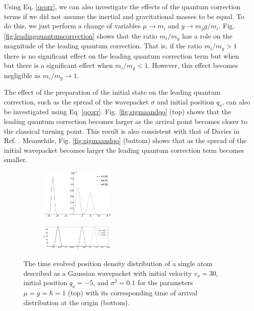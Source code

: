 \documentclass[%
 reprint,
 amsmath,amssymb,
 aps,
]{revtex4-1}
\begin{document}
Using Eq. \eqref{qcorr}, we can also investigate the effects of the quantum correction terms if we did not assume the inertial and gravitational masses to be equal. To do this, we just perform a change of variables $\mu\rightarrow m_i$ and $g\rightarrow m_g g / m_i$. Fig. \ref{fig:leadingquantumcorrection} shows that the ratio $m_i/m_g$ has a role on the magnitude of the leading quantum correction. That is, if the ratio $m_i/m_g>1$ there is no significant effect on the leading quantum correction term but when but there is a significant effect when $m_i/m_g<1$. However, this effect becomes negligible as $m_i/m_g \rightarrow 1$. 

The effect of the preparation of the initial state on the leading quantum correction, such as the spread of the wavepacket $\sigma$ and initial position $q_o$, can also be investigated using Eq. \eqref{qcorr}. Fig. \ref{fig:sigmaandqo} (top) shows that the leading quantum correction becomes larger as the arrival point becomes closer to the classical turning point. This result is also consistent with that of Davies in Ref. \cite{davies2004a}. Meanwhile, Fig. \ref{fig:sigmaandqo} (bottom) shows that as the spread of the initial wavepacket becomes larger the leading quantum correction term becomes smaller.

\begin{figure}[t!]
\begin{subfigure}
\centering
\includegraphics[width=0.4\textwidth]{toadist_wavefunction_evo}
\label{fig:pos_prob}
\end{subfigure}
\begin{subfigure}
\centering
\includegraphics[width=0.4\textwidth]{toadist_covariance_overlay}
\label{fig:toa_dist}
\end{subfigure}
\caption{The time evolved position density distribution of a single atom described as a Gaussian wavepacket with initial velocity $v_o=30$, initial position $q_o=-5$, and $\sigma^2=0.1$ for the parameters $\mu=g=\hbar=1$ (top) with its corresponding time of arrival distribution at the origin (bottom).}
\label{fig:covariance}
\end{figure}
\end{document}

